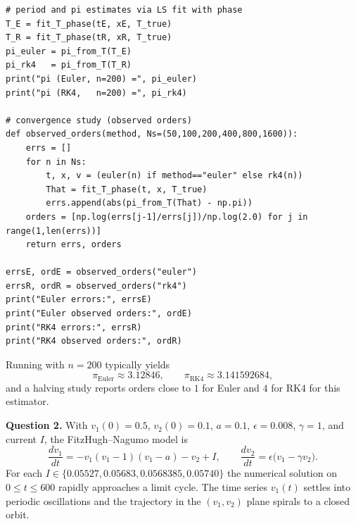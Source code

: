 \documentclass[11pt]{article}
\begin{document}
\begin{verbatim}
# period and pi estimates via LS fit with phase
T_E = fit_T_phase(tE, xE, T_true)
T_R = fit_T_phase(tR, xR, T_true)
pi_euler = pi_from_T(T_E)
pi_rk4   = pi_from_T(T_R)
print("pi (Euler, n=200) =", pi_euler)
print("pi (RK4,   n=200) =", pi_rk4)

# convergence study (observed orders)
def observed_orders(method, Ns=(50,100,200,400,800,1600)):
    errs = []
    for n in Ns:
        t, x, v = (euler(n) if method=="euler" else rk4(n))
        That = fit_T_phase(t, x, T_true)
        errs.append(abs(pi_from_T(That) - np.pi))
    orders = [np.log(errs[j-1]/errs[j])/np.log(2.0) for j in range(1,len(errs))]
    return errs, orders

errsE, ordE = observed_orders("euler")
errsR, ordR = observed_orders("rk4")
print("Euler errors:", errsE)
print("Euler observed orders:", ordE)
print("RK4 errors:", errsR)
print("RK4 observed orders:", ordR)
\end{verbatim}

Running with \(n=200\) typically yields
\[
\pi_{\text{Euler}}\approx 3.12846,\qquad \pi_{\text{RK4}}\approx 3.141592684,
\]
and a halving study reports orders close to \(1\) for Euler and \(4\) for RK4 for this estimator.



\newpage



{\bf Question 2.}
With \(v_{1}(0)=0.5\), \(v_{2}(0)=0.1\), \(a=0.1\), \(\epsilon=0.008\), \(\gamma=1\), and current \(I\), the FitzHugh–Nagumo model is
\[
\frac{dv_{1}}{dt}=-v_{1}(v_{1}-1)(v_{1}-a)-v_{2}+I,\qquad
\frac{dv_{2}}{dt}=\epsilon\bigl(v_{1}-\gamma v_{2}\bigr).
\]
For each \(I\in\{0.05527,0.05683,0.0568385,0.05740\}\) the numerical solution on \(0\le t\le 600\) rapidly approaches a limit cycle. The time series \(v_{1}(t)\) settles into periodic oscillations and the trajectory in the \((v_{1},v_{2})\) plane spirals to a closed orbit.
\end{document}
